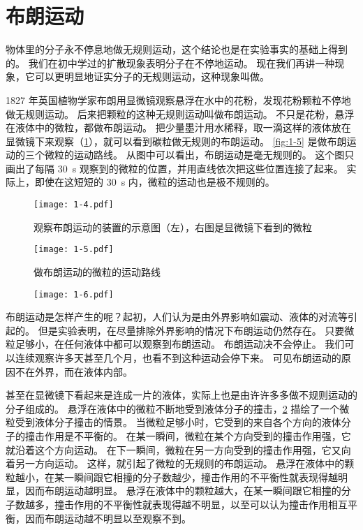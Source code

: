\section{布朗运动}
物体里的分子永不停息地做无规则运动，这个结论也是在实验事实的基础上得到的。
我们在初中学过的扩散现象表明分子在不停地运动。
现在我们再讲一种现象，它可以更明显地证实分子的无规则运动，这种现象叫做。

1827 年英国植物学家布朗用显微镜观察悬浮在水中的花粉，发现花粉颗粒不停地做无规则运动。
后来把颗粒的这种无规则运动叫做布朗运动。
不只是花粉，悬浮在液体中的微粒，都做布朗运动。
把少量墨汁用水稀释，取一滴这样的液体放在显微镜下来观察（\cref{fig:1-4}），就可以看到碳粒做无规则的布朗运动。
\cref{fig:1-5} 是做布朗运动的三个微粒的运动路线。
从图中可以看出，布朗运动是毫无规则的。
这个图只画出了每隔 \qty{30}{s} 观察到的微粒的位置，并用直线依次把这些位置连接了起来。
实际上，即使在这短短的 \qty{30}{s} 内，微粒的运动也是极不规则的。

\begin{figure}
  \texttt{[image: 1-4.pdf]}
  \caption{观察布朗运动的装置的示意图（左），右图是显微镜下看到的微粒}\label{fig:1-4}
\end{figure}

\begin{figure}
	\begin{minipage}[b]{0.48\linewidth}
		\centering
    \texttt{[image: 1-5.pdf]}
    \caption{做布朗运动的微粒的运动路线}\label{fig:1-5}
	\end{minipage}
	\begin{minipage}[b]{0.48\linewidth}
		\centering
    \texttt{[image: 1-6.pdf]}
    \caption{}\label{fig:1-6}
	\end{minipage}
\end{figure}

布朗运动是怎样产生的呢？起初，人们认为是由外界影响如震动、液体的对流等引起的。
但是实验表明，在尽量排除外界影响的情况下布朗运动仍然存在。
只要微粒足够小，在任何液体中都可以观察到布朗运动。
布朗运动决不会停止。
我们可以连续观察许多天甚至几个月，也看不到这种运动会停下来。
可见布朗运动的原因不在外界，而在液体内部。

甚至在显微镜下看起来是连成一片的液体，实际上也是由许许多多做不规则运动的分子组成的。
悬浮在液体中的微粒不断地受到液体分子的撞击，\cref{fig:1-6} 描绘了一个微粒受到液体分子撞击的情景。
当微粒足够小时，它受到的来自各个方向的液体分子的撞击作用是不平衡的。
在某一瞬间，微粒在某个方向受到的撞击作用强，它就沿着这个方向运动。
在下一瞬间，微粒在另一方向受到的撞击作用强，它又向着另一方向运动。
这样，就引起了微粒的无规则的布朗运动。
悬浮在液体中的颗粒越小，在某一瞬间跟它相撞的分子数越少，撞击作用的不平衡性就表现得越明显，因而布朗运动越明显。
悬浮在液体中的颗粒越大，在某一瞬间跟它相撞的分子数越多，撞击作用的不平衡性就表现得越不明显，以至可以认为撞击作用相互平衡，因而布朗运动越不明显以至观察不到。

